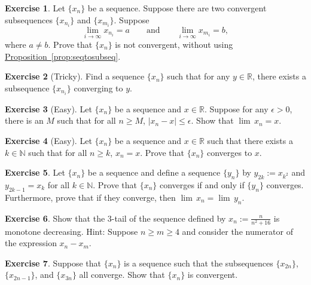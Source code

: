 \documentclass[12pt]{book}
\newcommand{\abs}[1]{\left\lvert {#1} \right\rvert}
\newcommand{\R}{{\mathbb{R}}}
\newcommand{\N}{{\mathbb{N}}}
\theoremstyle{plain}
\theoremstyle{remark}
\theoremstyle{definition}
\theoremstyle{exercise}
\newtheorem{exercise}{Exercise}[section]
\theoremstyle{example}
\newcommand{\propref}[1]{\hyperref[#1]{Proposition~\ref*{#1}}}
\begin{document}
\begin{exercise}
Let $\{ x_n \}$ be a sequence.
Suppose there are two convergent subsequences $\{ x_{n_i} \}$ and
$\{ x_{m_i} \}$.  Suppose 
\begin{equation*}
\lim_{i\to\infty} x_{n_i} = a
\qquad \text{and} \qquad
\lim_{i\to\infty} x_{m_i} = b,
\end{equation*}
where $a \not= b$.  Prove that $\{ x_n \}$ is not convergent, without
using \propref{prop:seqtosubseq}.
\end{exercise}

\begin{exercise}[Tricky]
Find a sequence $\{ x_n \}$ such that for any $y \in \R$, there exists a
subsequence $\{ x_{n_i} \}$ converging to $y$.
\end{exercise}

\begin{exercise}[Easy]
Let $\{ x_n \}$ be a sequence and $x \in \R$.
Suppose for any $\epsilon > 0$, there is an $M$ such that for
all $n \geq M$, $\abs{x_n-x} \leq \epsilon$.  Show that $\lim\, x_n = x$.
\end{exercise}

\begin{exercise}[Easy]
Let $\{ x_n \}$ be a sequence and $x \in \R$ such that
there exists a $k \in \N$ such that for all $n \geq k$,
$x_n = x$.  Prove that $\{ x_n \}$ converges to $x$.
\end{exercise}

\begin{exercise}
Let $\{ x_n \}$ be a sequence and
define a sequence $\{ y_n \}$ by
$y_{2k} := x_{k^2}$ and $y_{2k-1} = x_k$ for all $k \in \N$.
Prove that $\{ x_n \}$ converges if and only if $\{ y_n \}$ converges.
Furthermore, prove that if they converge, then
$\lim\, x_n = \lim\, y_n$.
\end{exercise}

\begin{exercise}
Show that the 3-tail of the sequence defined by $x_n := \frac{n}{n^2+16}$ is
monotone decreasing.  Hint: Suppose $n \geq m \geq 4$ and consider the 
numerator of the expression $x_n-x_m$.
\end{exercise}

\begin{exercise}
Suppose that $\{ x_n \}$ is a sequence such that
the subsequences $\{ x_{2n} \}$, $\{ x_{2n-1} \}$, and
$\{ x_{3n} \}$ all converge.  Show that $\{ x_n \}$ is convergent.
\end{exercise}
\end{document}

